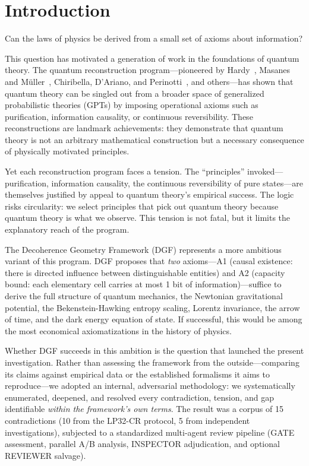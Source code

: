 \documentclass[12pt,a4paper]{article}
\theoremstyle{definition}
\theoremstyle{remark}
\begin{document}
\section{Introduction}

Can the laws of physics be derived from a small set of axioms about information?

This question has motivated a generation of work in the foundations of quantum theory. The quantum reconstruction program---pioneered by Hardy~\cite{Hardy2001,Hardy2013}, Masanes and M\"uller~\cite{MasanesMuller2011}, Chiribella, D'Ariano, and Perinotti~\cite{CDP2011,CDP2016}, and others---has shown that quantum theory can be singled out from a broader space of generalized probabilistic theories (GPTs) by imposing operational axioms such as purification, information causality, or continuous reversibility. These reconstructions are landmark achievements: they demonstrate that quantum theory is not an arbitrary mathematical construction but a necessary consequence of physically motivated principles.

Yet each reconstruction program faces a tension. The ``principles'' invoked---purification, information causality, the continuous reversibility of pure states---are themselves justified by appeal to quantum theory's empirical success. The logic risks circularity: we select principles that pick out quantum theory because quantum theory is what we observe. This tension is not fatal, but it limits the explanatory reach of the program.

The Decoherence Geometry Framework (DGF) \cite{DGF2026} represents a more ambitious variant of this program. DGF proposes that \emph{two} axioms---A1 (causal existence: there is directed influence between distinguishable entities) and A2 (capacity bound: each elementary cell carries at most 1 bit of information)---suffice to derive the full structure of quantum mechanics, the Newtonian gravitational potential, the Bekenstein-Hawking entropy scaling, Lorentz invariance, the arrow of time, and the dark energy equation of state. If successful, this would be among the most economical axiomatizations in the history of physics.

Whether DGF succeeds in this ambition is the question that launched the present investigation. Rather than assessing the framework from the outside---comparing its claims against empirical data or the established formalisms it aims to reproduce---we adopted an internal, adversarial methodology: we systematically enumerated, deepened, and resolved every contradiction, tension, and gap identifiable \emph{within the framework's own terms}. The result was a corpus of 15 contradictions (10 from the LP32-CR protocol, 5 from independent investigations), subjected to a standardized multi-agent review pipeline (GATE assessment, parallel A/B analysis, INSPECTOR adjudication, and optional REVIEWER salvage).
\end{document}
